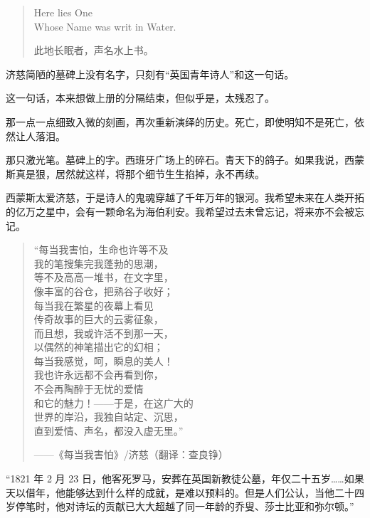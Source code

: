 \documentclass[AutoFakeBold=true]{book}
\begin{document}
\begin{quote}
	\begin{center}
		{\heiti Here lies One\\
		Whose Name was writ in Water.

		此地长眠者，声名水上书。}
	\end{center}
\end{quote}

济慈简陋的墓碑上没有名字，只刻有``英国青年诗人''和这一句话。

这一句话，本来想做上册的分隔结束，但似乎是，太残忍了。

\vspace*{1em}

那一点一点细致入微的刻画，再次重新演绎的历史。死亡，即使明知不是死亡，依然让人落泪。

那只激光笔。墓碑上的字。西班牙广场上的碎石。青天下的鸽子。如果我说，西蒙斯真是狠，居然就这样，将那个细节生生掐掉，永不再续。

西蒙斯太爱济慈，于是诗人的鬼魂穿越了千年万年的银河。我希望未来在人类开拓的亿万之星中，会有一颗命名为海伯利安。我希望过去未曾忘记，将来亦不会被忘记。

\begin{quote}
	``每当我害怕，生命也许等不及\\
	我的笔搜集完我蓬勃的思潮，\\
	等不及高高一堆书，在文字里，\\
	像丰富的谷仓，把熟谷子收好；\\
	每当我在繁星的夜幕上看见\\
	传奇故事的巨大的云雾征象，\\
	而且想，我或许活不到那一天，\\
	以偶然的神笔描出它的幻相；\\
	每当我感觉，呵，瞬息的美人！\\
	我也许永远都不会再看到你，\\
	不会再陶醉于无忧的爱情\\
	和它的魅力！——于是，在这广大的\\
	世界的岸沿，我独自站定、沉思，\\
	直到爱情、声名，都没入虚无里。''

	——《每当我害怕》/济慈（翻译：查良铮）
\end{quote}

``1821 年 2 月 23 日，他客死罗马，安葬在英国新教徒公墓，年仅二十五岁……如果天以借年，他能够达到什么样的成就，是难以预料的。但是人们公认，当他二十四岁停笔时，他对诗坛的贡献已大大超越了同一年龄的乔叟、莎士比亚和弥尔顿。''
\end{document}
